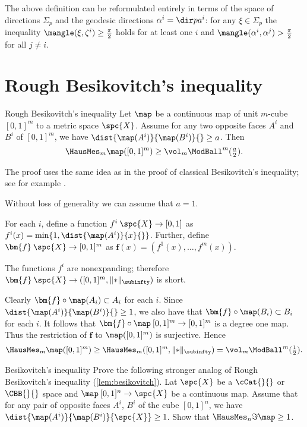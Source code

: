 The above definition can be reformulated entirely in terms of the space of directions $\Sigma_p$ and the geodesic directions $\alpha^i=\dir p{a^i}$: 
for any $\xi\in\Sigma_p$ 
the inequality $\mangle(\xi,\zeta^i)\ge\tfrac\pi2$ holds for at least one $i$
and $\mangle(\alpha^i,\alpha^j)>\tfrac\pi2$ for all $j\not=i$.












\section{Rough Besikovitch's inequality}


\begin{thm}{Rough Besikovitch's inequality}\label{lem:besikovitch}
Let  $\map$ be a continuous map of unit $m$-cube $[0,1]^m$ to a metric space $\spc{X}$.
Assume for any two opposite faces $A^i$ and $B^i$ of $[0,1]^m$,
we have $\dist{\map(A^i)}{\map(B^i)}{}\ge a$.
Then 
$$\HausMes_m\map([0,1]^m)\ge \vol_m\ModBall^m(\tfrac{a}{2}).$$

\end{thm}

The proof uses the same idea as in
the proof of classical Besikovitch's inequality;
see for example \cite[5.6.9]{BBI}.

Without loss of generality we can assume that $a=1$.

For each $i$,
define a function $f^i\: \spc{X}\to [0,1]$ 
as $f^i(x) = \min\{1, \dist{\map(A^i)}{x}{}\}$.
Further, define $\bm{f}\:\spc{X}\to[0,1]^m$
as
$\bm{f}(x) = (f^1(x),\dots, f^m(x))$. 

The functions $f^i$ are nonexpanding;
therefore $\bm{f}\:\spc{X}\to ([0,1]^m,\|{*}\|_\subinfty)$ is short.

Clearly
$\bm{f}\circ\map(A_i)\subset A_i$ for each $i$.
Since $\dist{\map(A^i)}{\map(B^i)}{}\ge 1$,
we also have that  $\bm{f}\circ\map(B_i)\subset B_i$ for each $i$. 
It follows that $\bm{f}\circ\map\:[0,1]^m\to [0,1]^m$ is a degree one map.
Thus the restriction of $\bm{f}$ to $\map([0,1]^m)$ is surjective.
Hence 
$$\HausMes_m\map([0,1]^m)\ge \HausMes_m([0,1]^m,\|{*}\|_\subinfty)=\vol_m\ModBall^m(\tfrac12).$$
\qedsf






\begin{thm}{Besikovitch's inequality}
Prove the following stronger analog of Rough Besikovitch's inequality (\ref{lem:besikovitch}).
Lat $\spc{X}$ be a $\cCat{}{}$ or $\CBB{}{}$ space and $\map\:[0,1]^n\to\spc{X}$ be a continuous map.
Assume that for any pair of opposite faces $A^i$, $B^i$ of the cube $[0,1]^n$, 
we have $\dist{\map(A^i)}{\map(B^i)}{\spc{X}}\ge 1$.
Show that $\HausMes_n\Im\map\ge 1$.
\end{thm}






